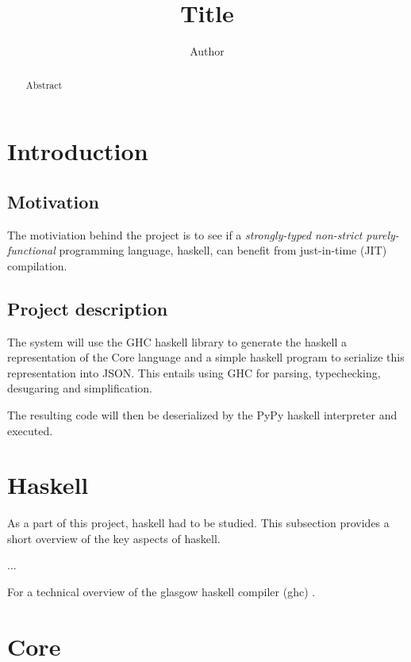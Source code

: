 \documentclass{article}
\begin{document}
\title{Title}
\author{Author}
\maketitle

\begin{abstract}
Abstract
\end{abstract}

\clearpage

\tableofcontents

\clearpage

\section{Introduction}

\subsection{Motivation}

The motiviation behind the project is to see if a \emph{strongly-typed} 
\emph{non-strict} \emph{purely-functional} programming language, haskell, 
can benefit from just-in-time (JIT) compilation.

\subsection{Project description}

The system will use the GHC haskell library to generate the haskell a 
representation of the Core language and a simple haskell program to 
serialize this representation into JSON. This entails using GHC for
parsing, typechecking, desugaring and simplification.

The resulting code will then be deserialized by the PyPy haskell interpreter 
and executed.

\section{Haskell}

As a part of this project, haskell had to be studied. This subsection provides a
short overview of the key aspects of haskell.

...

For a technical overview of the glasgow haskell compiler (ghc) \cite{ghc}.

\section{Core}
\end{document}
